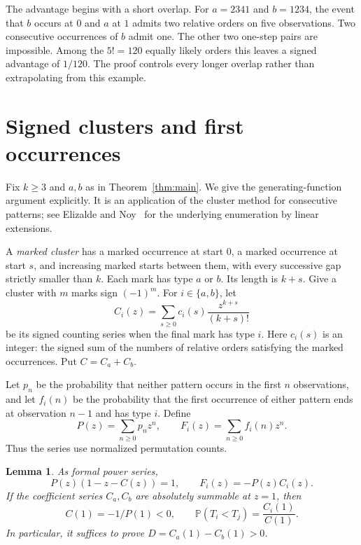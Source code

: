 \documentclass[11pt]{amsart}
\newtheorem{lemma}[theorem]{Lemma}
\theoremstyle{remark}
\newcommand{\Prb}{\mathbb P}
\begin{document}
The advantage begins with a short overlap. For $a=2341$ and $b=1234$, the event that $b$ occurs at $0$ and $a$ at $1$ admits two relative orders on five observations. Two consecutive occurrences of $b$ admit one. The other two one-step pairs are impossible. Among the $5!=120$ equally likely orders this leaves a signed advantage of $1/120$. The proof controls every longer overlap rather than extrapolating from this example.

\section{Signed clusters and first occurrences}

Fix $k\ge3$ and $a,b$ as in Theorem~\ref{thm:main}. We give the generating-function argument explicitly. It is an application of the cluster method for consecutive patterns; see Elizalde and Noy~\cite{ElizaldeNoy2012} for the underlying enumeration by linear extensions.

A \emph{marked cluster} has a marked occurrence at start $0$, a marked occurrence at start $s$, and increasing marked starts between them, with every successive gap strictly smaller than $k$. Each mark has type $a$ or $b$. Its length is $k+s$. Give a cluster with $m$ marks sign $(-1)^m$. For $i\in\{a,b\}$, let
\[
 C_i(z)=\sum_{s\ge0} c_i(s)\frac{z^{k+s}}{(k+s)!}
\]
be its signed counting series when the final mark has type $i$. Here $c_i(s)$ is an integer: the signed sum of the numbers of relative orders satisfying the marked occurrences. Put $C=C_a+C_b$.

Let $p_n$ be the probability that neither pattern occurs in the first $n$ observations, and let $f_i(n)$ be the probability that the first occurrence of either pattern ends at observation $n-1$ and has type $i$. Define
\[
 P(z)=\sum_{n\ge0}p_nz^n,\qquad
 F_i(z)=\sum_{n\ge0} f_i(n)z^n.
\]
Thus the series use normalized permutation counts.

\begin{lemma}\label{lem:series}
As formal power series,
\begin{equation}\label{eq:series}
 P(z)(1-z-C(z))=1,\qquad F_i(z)=-P(z)C_i(z).
\end{equation}
If the coefficient series $C_a,C_b$ are absolutely summable at $z=1$, then
\begin{equation}\label{eq:race}
 C(1)=-1/P(1)<0,\qquad \Prb(T_i<T_j)=\frac{C_i(1)}{C(1)}.
\end{equation}
In particular, it suffices to prove $D=C_a(1)-C_b(1)>0$.
\end{lemma}
\end{document}
